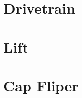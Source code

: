 \documentclass[../main.tex]{subfiles}
\begin{document}
\chapter{Drivetrain}


\chapter{Lift}


\chapter{Cap Fliper}

\end{document}
